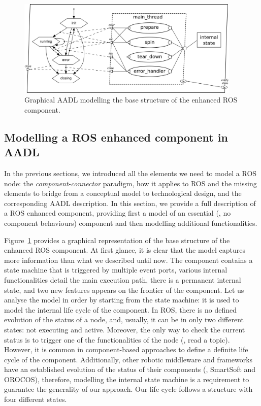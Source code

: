 \begin{figure}[t]
    \centering
    \includegraphics[width=0.95\textwidth]{gfx/essential}
    \caption{Graphical AADL modelling the base structure of the enhanced ROS component.}\label{fig:essential}
\end{figure}

\subsection{Modelling a ROS enhanced component in AADL}
\label{sec:ros-in-aadl}
In the previous sections, we introduced all the elements we need to model a ROS node: the \textit{component-connector} paradigm, how it applies to ROS and the missing elements to bridge from a conceptual model to technological design, and the corresponding AADL description. In this section, we provide a full description of a ROS enhanced component, providing first a model of an essential (\ie, no component behaviours) component and then modelling additional functionalities.

Figure~\ref{fig:essential} provides a graphical representation of the base structure of the enhanced ROS component. At first glance, it is clear that the model captures more information than what we described until now. The component contains a state machine that is triggered by multiple event ports, various internal functionalities detail the main execution path, there is a permanent internal state, and two new features appears on the frontier of the component. Let us analyse the model in order by starting from the state machine: it is used to model the internal life cycle of the component. In ROS, there is no defined evolution of the status of a node, and, usually, it can be in only two different states: not executing and active. Moreover, the only way to check the current status is to trigger one of the functionalities of the node (\eg, read a topic). However, it is common in component-based approaches to define a definite life cycle of the component. Additionally, other robotic middleware and frameworks have an established evolution of the status of their components (\eg, SmartSoft and OROCOS), therefore, modelling the internal state machine is a requirement to guarantee the generality of our approach. Our life cycle follows a structure with four different states.

